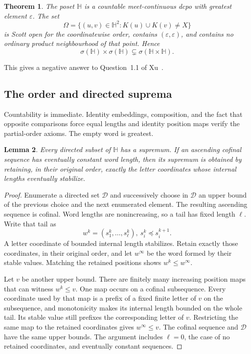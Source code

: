 \documentclass[10pt,a4paper]{article}
\newtheorem{theorem}{Theorem}[section]
\newtheorem{lemma}[theorem]{Lemma}
\theoremstyle{definition}
\newcommand{\HH}{\mathbb H}
\begin{document}
\begin{theorem}\label{word:thm:main}
The poset $\HH$ is a countable meet-continuous dcpo with greatest element $\varepsilon$. The set
\begin{equation}\label{word:eq:Omega}
 \Omega=\{(u,v)\in\HH^2:K(u)\cup K(v)\neq X\}
\end{equation}
is Scott open for the coordinatewise order, contains $(\varepsilon,\varepsilon)$, and contains no ordinary product neighbourhood of that point. Hence
\[
 \sigma(\HH)\times\sigma(\HH)
 \subsetneq
 \sigma(\HH\times\HH).
\]
\end{theorem}

This gives a negative answer to Question~1.1 of Xu~\cite{Xu}.


\subsection{The order and directed suprema}
Countability is immediate. Identity embeddings, composition, and the fact that opposite comparisons force equal lengths and identity position maps verify the partial-order axioms. The empty word is greatest.

\begin{lemma}\label{word:lem:sup}
Every directed subset of $\HH$ has a supremum. If an ascending cofinal sequence has eventually constant word length, then its supremum is obtained by retaining, in their original order, exactly the letter coordinates whose internal lengths eventually stabilize.
\end{lemma}
\begin{proof}
Enumerate a directed set $\mathcal D$ and successively choose in $\mathcal D$ an upper bound of the previous choice and the next enumerated element. The resulting ascending sequence is cofinal. Word lengths are nonincreasing, so a tail has fixed length $\ell$. Write that tail as
\[
 w^k=(s_1^k,\ldots,s_\ell^k),
 ~
 s_i^k\preceq s_i^{k+1}.
\]
A letter coordinate of bounded internal length stabilizes. Retain exactly those coordinates, in their original order, and let $w^\infty$ be the word formed by their stable values. Matching the retained positions shows $w^k\leq w^\infty$.

Let $v$ be another upper bound. There are finitely many increasing position maps that can witness $w^k\leq v$. One map occurs on a cofinal subsequence. Every coordinate used by that map is a prefix of a fixed finite letter of $v$ on the subsequence, and monotonicity makes its internal length bounded on the whole tail. Its stable value still prefixes the corresponding letter of $v$. Restricting the same map to the retained coordinates gives $w^\infty\leq v$. The cofinal sequence and $\mathcal D$ have the same upper bounds. The argument includes $\ell=0$, the case of no retained coordinates, and eventually constant sequences.
\end{proof}
\end{document}
